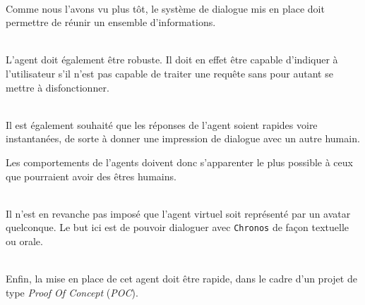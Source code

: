 ~\\\indent
Comme nous l'avons vu plus tôt, le système de dialogue mis en place doit permettre de réunir un ensemble d'informations.

~\\\indent
L'agent doit également être robuste. Il doit en effet être capable d'indiquer à l'utilisateur s'il n'est pas capable de traiter une requête sans pour autant se mettre à disfonctionner.

~\\\indent 
Il est également souhaité que les réponses de l'agent soient rapides voire instantanées, de sorte à donner une impression de dialogue avec un autre humain. 

Les comportements de l'agents doivent donc s'apparenter le plus possible à ceux que pourraient avoir des êtres humains.

~\\\indent
Il n'est en revanche pas imposé que l'agent virtuel soit représenté par un avatar quelconque. Le but ici est de pouvoir dialoguer avec \texttt{Chronos} de façon textuelle ou orale.

~\\\indent 
Enfin, la mise en place de cet agent doit être rapide, dans le cadre d'un projet de type \emph{Proof Of Concept} (\emph{POC}).


